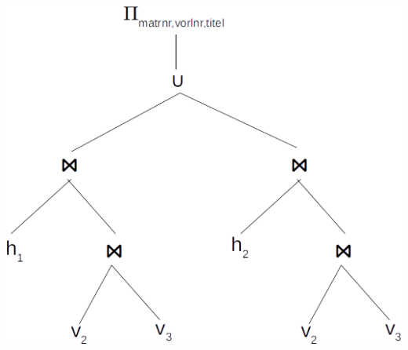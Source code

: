 \documentclass[11pt,a4paper,parskip=half ]{scrartcl}
\begin{document}
	\includegraphics[scale=.6]{2b.png}
	
\end{document}
